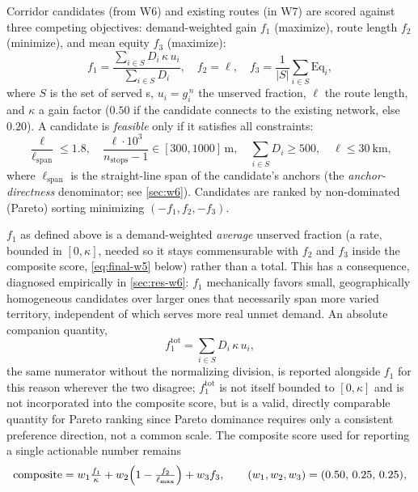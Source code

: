 Corridor candidates (from W6) and existing routes (in W7) are scored against three
competing objectives: demand-weighted gain $f_1$ (maximize), route length $f_2$
(minimize), and mean equity $f_3$ (maximize):
\begin{equation}
  f_1 = \frac{\sum_{i\in S} D_i\, \kappa\, u_i}{\sum_{i\in S} D_i}, \quad
  f_2 = \ell, \quad
  f_3 = \frac{1}{|S|}\sum_{i\in S}\mathrm{Eq}_i,
  \label{eq:objectives}
\end{equation}
where $S$ is the set of served \ageb{}s, $u_i = g^{\,n}_i$ the unserved fraction,
$\ell$ the route length, and $\kappa$ a gain factor ($\num{0.50}$ if the candidate
connects to the existing network, else $\num{0.20}$). A candidate is
\emph{feasible} only if it satisfies all constraints:
\begin{equation}
  \frac{\ell}{\ell_{\text{span}}} \le 1.8, \quad
  \frac{\ell\cdot 10^3}{n_{\text{stops}}-1} \in [300,1000]\,\si{\metre}, \quad
  \textstyle\sum_{i\in S} D_i \ge 500, \quad \ell \le \SI{30}{\kilo\metre},
  \label{eq:constraints}
\end{equation}
where $\ell_{\text{span}}$ is the straight-line span of the candidate's anchors (the
\emph{anchor-directness} denominator; see \cref{sec:w6}). Candidates are ranked by
non-dominated (Pareto) sorting minimizing $(-f_1, f_2, -f_3)$.

$f_1$ as defined above is a demand-weighted \emph{average} unserved fraction (a rate,
bounded in $[0,\kappa]$, needed so it stays commensurable with $f_2$ and $f_3$ inside the
composite score, \cref{eq:final-w5} below) rather than a total. This has a consequence,
diagnosed empirically in \cref{sec:res-w6}: $f_1$ mechanically favors small,
geographically homogeneous candidates over larger ones that necessarily span more varied
territory, independent of which serves more real unmet demand. An absolute companion
quantity,
\begin{equation}
  f_1^{\text{tot}} = \sum_{i\in S} D_i\, \kappa\, u_i,
  \label{eq:f1-total}
\end{equation}
the same numerator without the normalizing division, is reported alongside $f_1$ for
this reason wherever the two disagree; $f_1^{\text{tot}}$ is not itself bounded to
$[0,\kappa]$ and is not incorporated into the composite score, but is a valid, directly
comparable quantity for Pareto ranking since Pareto dominance requires only a consistent
preference direction, not a common scale. The composite score used for reporting a
single actionable number remains
\begin{equation}
  \text{composite} = w_1 \tfrac{f_1}{\kappa} + w_2\Bigl(1 - \tfrac{f_2}{\ell_{\max}}\Bigr)
    + w_3 f_3, \qquad (w_1,w_2,w_3) = (0.50,\,0.25,\,0.25),
  \label{eq:final-w5}
\end{equation}

